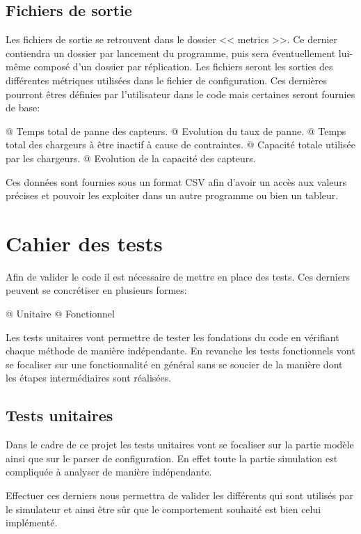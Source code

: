 \documentclass[final]{polytech/polytech}
\begin{document}
	\section{Fichiers de sortie\label{sec:csvoutput}}
		Les fichiers de sortie se retrouvent dans le dossier << metrics >>.
		Ce dernier contiendra un dossier par lancement du programme, puis sera éventuellement lui-même composé d'un dossier par réplication.
		Les fichiers seront les sorties des différentes métriques utilisées dans le fichier de configuration.
		Ces dernières pourront êtres définies par l'utilisateur dans le code mais certaines seront fournies de base:
		\begin{easylist}[itemize]
			@ Temps total de panne des capteurs.
			@ Evolution du taux de panne.
			@ Temps total des chargeurs à être inactif à cause de contraintes.
			@ Capacité totale utilisée par les chargeurs.
			@ Evolution de la capacité des capteurs.
		\end{easylist}
		
		Ces données sont fournies sous un format CSV afin d'avoir un accès aux valeurs précises et pouvoir les exploiter dans un autre programme ou bien un tableur.

\chapter{Cahier des tests}
	Afin de valider le code il est nécessaire de mettre en place des tests.
	Ces derniers peuvent se concrétiser en plusieurs formes:
	\begin{easylist}
		@ Unitaire
		@ Fonctionnel	
	\end{easylist}

	Les tests unitaires vont permettre de tester les fondations du code en vérifiant chaque méthode de manière indépendante.
	En revanche les tests fonctionnels vont se focaliser sur une fonctionnalité en général sans se soucier de la manière dont les étapes intermédiaires sont réalisées.
	
	\section{Tests unitaires}
		Dans le cadre de ce projet les tests unitaires vont se focaliser sur la partie modèle ainsi que sur le parser de configuration.
		En effet toute la partie simulation est compliquée à analyser de manière indépendante.
		
		Effectuer ces derniers nous permettra de valider les différents qui sont utilisés par le simulateur et ainsi être sûr que le comportement souhaité est bien celui implémenté.
		
\end{document}
